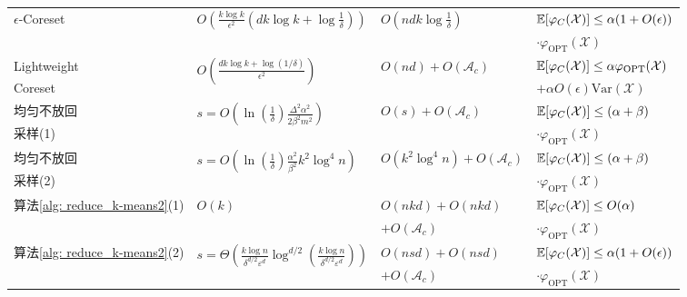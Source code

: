 {\begin{longtable}{llll}
		\multirow{2}{*}{$\epsilon$-Coreset} & \multirow{2}{*}{$O(\frac{k\log k}{\epsilon^2} (dk\log k+\log\frac{1}{\delta}))$} & \multirow{2}{*}{$O(ndk\log\frac{1}{\delta})$} & $\mathbb{E}[\varphi_C(\mathcal{X})] \leq \alpha(1+O(\epsilon))$ \\
		& & & $\cdot \varphi_{\text{OPT}}(\mathcal{X})$ \\

		Lightweight & \multirow{2}{*}{$O(\frac{dk\log k + \log(1/\delta)}{\epsilon^2})$} & \multirow{2}{*}{$O(nd)+O(\mathcal{A}_c)$} & $\mathbb{E}[\varphi_C(\mathcal{X})] \leq \alpha \varphi_{\text{OPT}}(\mathcal{X})$ \\
		Coreset & & & $+ \alpha O(\epsilon) \text{Var}(\mathcal{X})$\\

		均匀不放回 & \multirow{2}{*}{$s = O(\ln \left(\frac{1}{\delta}\right) \frac{\Delta^{2} \alpha^{2}}{2 \beta^{2} m^{2}})$} & \multirow{2}{*}{$O(s)+O(\mathcal{A}_c)$} & $\mathbb{E}[\varphi_C(\mathcal{X})] \leq (\alpha+\beta)$ \\
		采样(1) &  &  & $\cdot \varphi_{\text{OPT}}(\mathcal{X})$ \\

		均匀不放回 & \multirow{2}{*}{$s = O(\ln(\frac{1}{\delta})\frac{\alpha^2}{\beta^2}k^2\log^4 n)$} & \multirow{2}{*}{$O(k^2 \log^4 n)+O(\mathcal{A}_c)$} & $\mathbb{E}[\varphi_C(\mathcal{X})] \leq (\alpha+\beta)$ \\
		采样(2) &  &  & $\cdot \varphi_{\text{OPT}}(\mathcal{X})$ \\

		\multirow{2}{*}{算法\ref{alg: reduce_k-means2}(1)} & \multirow{2}{*}{$O(k)$} & $O(nkd)+O(nkd)$ & $\mathbb{E}[\varphi_C(\mathcal{X})] \leq O(\alpha)$ \\
		& & $+O(\mathcal{A}_c)$ & $\cdot \varphi_{\text{OPT}}(\mathcal{X})$ \\

		\multirow{2}{*}{算法\ref{alg: reduce_k-means2}(2)} & \multirow{2}{*}{$s = \Theta\left(\frac{k \log n}{\delta^{d / 2} \varepsilon^{d}} \log ^{d / 2}\left(\frac{k \log n}{\delta^{d / 2} \varepsilon^{d}}\right)\right)$} & $O(nsd)+O(nsd)$ & $\mathbb{E}[\varphi_C(\mathcal{X})] \leq \alpha(1+O(\epsilon))$ \\
		& & $+O(\mathcal{A}_c)$ & $\cdot \varphi_{\text{OPT}}(\mathcal{X})$ \\

		\bottomrule
	\end{longtable}

}

